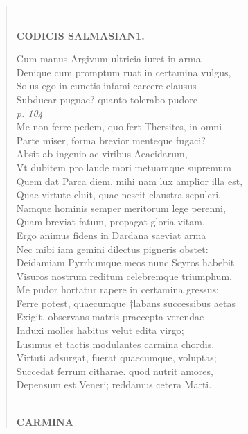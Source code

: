 \documentclass[11pt, a4paper]{report}
\begin{document}
\begin{verse}
        ﻿\pagebreak 
     \marginpar{[165]} \begin{center} \textbf{CODICIS SALMASIAN1.} \end{center}Cum manus Argivum ultricia iuret in arma. \\ Denique cum promptum ruat in certamina vulgus, \\ Solus ego in cunctis infami carcere clausus \\ Subducar pugnae? quanto tolerabo pudore \\ \textit{p. 104} \\ Me non ferre pedem, quo fert Thersites, in omni \\ Parte miser, forma brevior menteque fugaci? \\ Absit ab ingenio ac viribus Aeacidarum, \\ Vt dubitem pro laude mori metuamque supremum \\ Quem dat Parca diem. mihi nam lux amplior illa est, \\ Quae virtute cluit, quae nescit claustra sepulcri. \\ Namque hominis semper meritorum lege perenni, \\ Quam breviat fatum, propagat gloria vitam. \\ Ergo animus fidens in Dardana saeviat arma \\ Nec mibi iam gemini dilectus pigneris obstet: \\ Deidamiam Pyrrhumque meos nunc Scyros habebit \\ Visuros nostrum reditum celebremque triumphum. \\ Me pudor hortatur rapere in certamina gressus; \\ Ferre potest, quaecumque †labans successibus aetas \\ Exigit. observans matris praecepta verendae \\ Induxi molles habitus velut edita virgo; \\ Lusimus et tactis modulantes carmina chordis. \\ Virtuti adsurgat, fuerat quaecumque, voluptas; \\ Succedat ferrum citharae. quod nutrit amores, \\ Depensum est Veneri; reddamus cetera Marti. \\ 
        ﻿\pagebreak 
     \marginpar{[166]} \begin{center} \textbf{CARMINA} \end{center}
      \end{verse}
  
\end{document}

